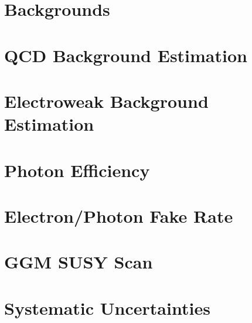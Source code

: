 \section{Backgrounds}

\section{QCD Background Estimation}

\section{Electroweak Background Estimation}

\section{Photon Efficiency}

\section{Electron/Photon Fake Rate}

\section{GGM SUSY Scan}

\section{Systematic Uncertainties}
